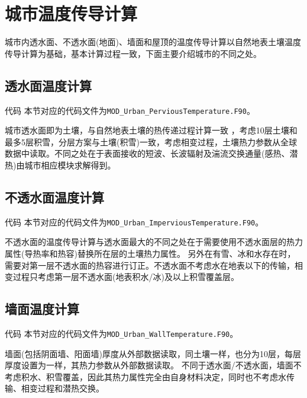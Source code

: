 \section{城市温度传导计算}
城市内透水面、不透水面(地面)、墙面和屋顶的温度传导计算以自然地表土壤温度传导计算为基础，基本计算过程一致，下面主要介绍城市的不同之处。

\subsection{透水面温度计算}
\begin{mymdframed}{代码}
  本节对应的代码文件为\texttt{MOD\_Urban\_PerviousTemperature.F90}。
\end{mymdframed}

城市透水面即为土壤，与自然地表土壤的热传递过程计算一致 ，考虑10层土壤和最多5层积雪，分层方案与土壤(积雪)一致，考虑相变过程，土壤热力参数从全球数据中读取。不同之处在于表面接收的短波、长波辐射及湍流交换通量(感热、潜热)由城市相应模块求解得到。

\subsection{不透水面温度计算}
\begin{mymdframed}{代码}
  本节对应的代码文件为\texttt{MOD\_Urban\_ImperviousTemperature.F90}。
\end{mymdframed}

不透水面的温度传导计算与透水面最大的不同之处在于需要使用不透水面层的热力属性(导热率和热容)替换所在层的土壤热力属性。
另外在有雪、冰和水存在时，需要对第一层不透水面的热容进行订正。不透水面不考虑水在地表以下的传输，相变过程只考虑第一层不透水面(地表积水/冰)及以上积雪覆盖层。

\subsection{墙面温度计算}

\begin{mymdframed}{代码}
  本节对应的代码文件为\texttt{MOD\_Urban\_WallTemperature.F90}。
\end{mymdframed}

墙面(包括阴面墙、阳面墙)厚度从外部数据读取，同土壤一样，也分为10层，每层厚度设置为一样，其热力参数从外部数据读取。
不同于透水面/不透水面，墙面不考虑积水、积雪覆盖，因此其热力属性完全由自身材料决定，同时也不考虑水传输、相变过程和潜热交换。

